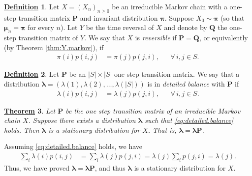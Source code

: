 \documentclass[12pt]{book}
\numberwithin{equation}{chapter}
\theoremstyle{plain}
\newtheorem{theorem}{\underline{Theorem}}
\numberwithin{theorem}{section}
\theoremstyle{definition}
\newtheorem{definition}[theorem]{\underline{Definition}}
\numberwithin{exercise}{chapter}
\let\oldendproof\endproof
\renewenvironment{proof}[1][\proofname]{%
  \oldproof[\scshape\underline{#1}]%
}{\oldendproof}
\newcommand{\<}{\langle}
\renewcommand{\>}{\rangle}
\renewcommand{\(}{\left(}
\renewcommand{\)}{\right)}
\renewcommand{\[}{\left[}
\renewcommand{\]}{\right]}
\newcommand\lam{\lambda}
\newcommand\Pv{\pmb{P}}
\newcommand\Qv{\pmb{Q}}
\newcommand\muv{\pmb{\mu}}
\newcommand\piv{\pmb{\pi}}
\newcommand\lamv{\pmb{\lambda}}
\begin{document}
\begin{definition}
\label{def:reversible}
Let $X=(X_n)_{n \geq 0}$ be an irreducible Markov chain with a one-step transition matrix $\Pv$ and invariant distribution $\piv$.
Suppose $X_0 \sim \piv$ (so that $\muv_n = \piv$ for every $n$).
Let $Y$ be the time reversal of $X$ and denote by $\Qv$ the one-step transition matrix of $Y$.
We say that $X$ is \emph{reversible} if $\Pv = \Qv$, or equivalently (by Theorem \ref{thm:Y.markov}), if
\begin{align}
\pi(i) p(i,j)
	&=	\pi(j) p(j,i) , &
	&		\forall \, i,j \in S . 
\end{align}
\end{definition}

\begin{definition}
\label{def:detailed.balance}
Let $\Pv$ be an $|S|\times|S|$ one step transition matrix.
We say that a distribution $\lamv = (\lam(1), \lam(2), \ldots, \lam(|S|))$ is in \emph{detailed balance} with $\Pv$ if
\begin{align}
\lam(i) p(i,j)
	&=	\lam(j) p(j,i) , &
	&		\forall \, i,j \in S . \label{eq:detailed.balance}
\end{align}
\end{definition}


\begin{theorem}
Let $\Pv$ be the one step transition matrix of an irreducible Markov chain $X$.
Suppose there exists a distribution $\lamv$ such that \eqref{eq:detailed.balance} holds.
Then $\lamv$ is a stationary distribution for $X$.  That is, $\lamv = \lamv \Pv$.
\end{theorem}

\begin{proof}
Assuming \eqref{eq:detailed.balance} holds, we have
\begin{align}
\sum_i \lam(i) p(i,j)
	&=	\sum_i \lam(j) p(j,i)
	=		\lam(j) \sum_i p(j,i)
	=		\lam(j) .
\end{align}
Thus, we have proved $\lamv = \lamv \Pv$, and thus $\lamv$ is a stationary distribution for $X$.
\end{proof}

\end{document}
